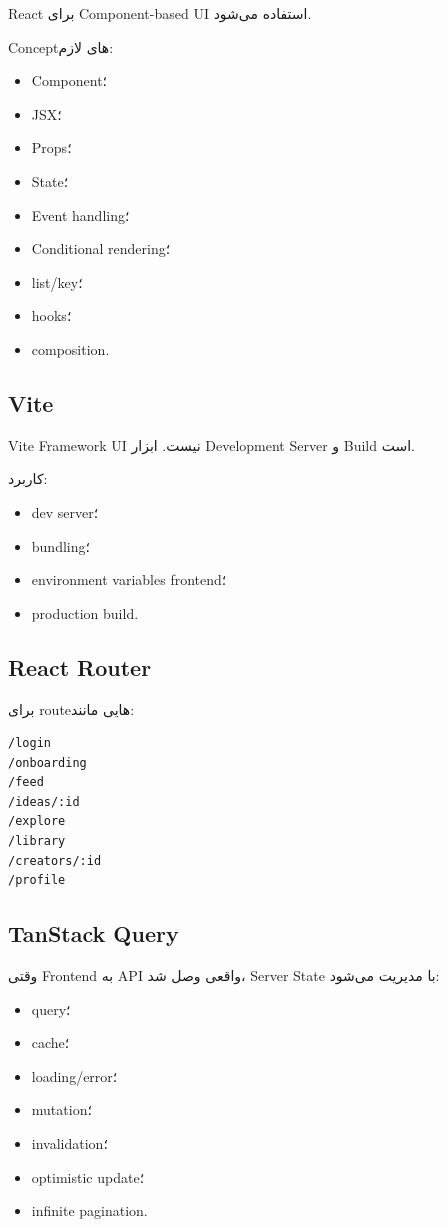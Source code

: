 React برای Component-based UI استفاده می‌شود.

Conceptهای لازم:
\begin{itemize}
  \item Component؛
  \item JSX؛
  \item Props؛
  \item State؛
  \item Event handling؛
  \item Conditional rendering؛
  \item list/key؛
  \item hooks؛
  \item composition.
\end{itemize}

\subsection{Vite}

Vite Framework UI نیست. ابزار Development Server و Build است.

کاربرد:
\begin{itemize}
  \item dev server؛
  \item bundling؛
  \item environment variables frontend؛
  \item production build.
\end{itemize}

\subsection{React Router}

برای routeهایی مانند:
\begin{latin}
\begin{lstlisting}
/login
/onboarding
/feed
/ideas/:id
/explore
/library
/creators/:id
/profile
\end{lstlisting}
\end{latin}

\subsection{TanStack Query}

وقتی Frontend به API واقعی وصل شد، Server State با  مدیریت می‌شود:
\begin{itemize}
  \item query؛
  \item cache؛
  \item loading/error؛
  \item mutation؛
  \item invalidation؛
  \item optimistic update؛
  \item infinite pagination.
\end{itemize}

